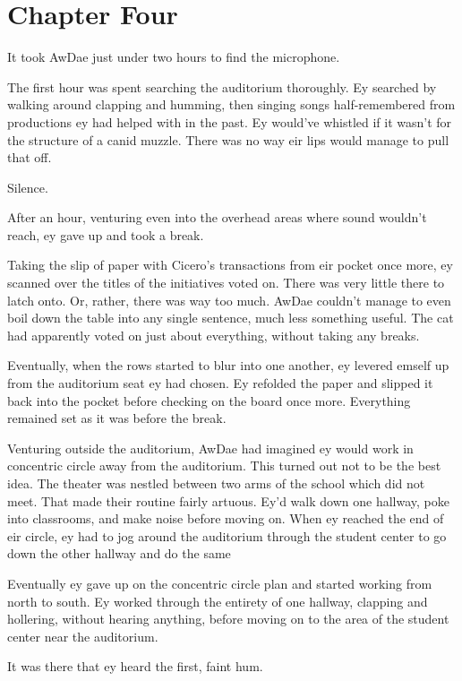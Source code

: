 \chapter*{Chapter Four}

It took AwDae just under two hours to find the microphone.

The first hour was spent searching the auditorium thoroughly.  Ey searched by walking around clapping and humming, then singing songs half-remembered from productions ey had helped with in the past.  Ey would've whistled if it wasn't for the structure of a canid muzzle.  There was no way eir lips would manage to pull that off.

Silence.

After an hour, venturing even into the overhead areas where sound wouldn't reach, ey gave up and took a break.

Taking the slip of paper with Cicero's transactions from eir pocket once more, ey scanned over the titles of the initiatives voted on.  There was very little there to latch onto.  Or, rather, there was way too much.  AwDae couldn't manage to even boil down the table into any single sentence, much less something useful.  The cat had apparently voted on just about everything, without taking any breaks.

Eventually, when the rows started to blur into one another, ey levered emself up from the auditorium seat ey had chosen.  Ey refolded the paper and slipped it back into the pocket before checking on the board once more.  Everything remained set as it was before the break.

Venturing outside the auditorium, AwDae had imagined ey would work in concentric circle away from the auditorium.  This turned out not to be the best idea.  The theater was nestled between two arms of the school which did not meet.  That made their routine fairly artuous.  Ey'd walk down one hallway, poke into classrooms, and make noise before moving on.  When ey reached the end of eir circle, ey had to jog around the auditorium through the student center to go down the other hallway and do the same

Eventually ey gave up on the concentric circle plan and started working from north to south.   Ey worked through the entirety of one hallway, clapping and hollering, without hearing anything, before moving on to the area of the student center near the auditorium.

It was there that ey heard the first, faint hum.

